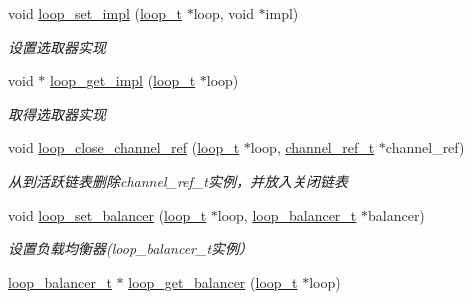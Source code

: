 \begin{DoxyCompactItemize}
void \hyperlink{a00052_aa9654f1b872059f74665506fd67c9bc5_aa9654f1b872059f74665506fd67c9bc5}{loop\+\_\+set\+\_\+impl} (\hyperlink{a00044_a9c3ad1cd2de83e09f3a7b59fa82c94ee_a9c3ad1cd2de83e09f3a7b59fa82c94ee}{loop\+\_\+t} $\ast$loop, void $\ast$impl)
\begin{DoxyCompactList}\small\item\em 设置选取器实现 \end{DoxyCompactList}\item 
void $\ast$ \hyperlink{a00052_a0f78295541723911955dd41b71ceece1_a0f78295541723911955dd41b71ceece1}{loop\+\_\+get\+\_\+impl} (\hyperlink{a00044_a9c3ad1cd2de83e09f3a7b59fa82c94ee_a9c3ad1cd2de83e09f3a7b59fa82c94ee}{loop\+\_\+t} $\ast$loop)
\begin{DoxyCompactList}\small\item\em 取得选取器实现 \end{DoxyCompactList}\item 
void \hyperlink{a00052_a9328cf8ba2faccbf363b41e524631b75_a9328cf8ba2faccbf363b41e524631b75}{loop\+\_\+close\+\_\+channel\+\_\+ref} (\hyperlink{a00044_a9c3ad1cd2de83e09f3a7b59fa82c94ee_a9c3ad1cd2de83e09f3a7b59fa82c94ee}{loop\+\_\+t} $\ast$loop, \hyperlink{a00044_a151271c9d188ef28d4d24bb81dcc1263_a151271c9d188ef28d4d24bb81dcc1263}{channel\+\_\+ref\+\_\+t} $\ast$channel\+\_\+ref)
\begin{DoxyCompactList}\small\item\em 从到活跃链表删除channel\+\_\+ref\+\_\+t实例，并放入关闭链表 \end{DoxyCompactList}\item 
void \hyperlink{a00052_abedbb538c1cc8ef805dbfc0f58d80f9e_abedbb538c1cc8ef805dbfc0f58d80f9e}{loop\+\_\+set\+\_\+balancer} (\hyperlink{a00044_a9c3ad1cd2de83e09f3a7b59fa82c94ee_a9c3ad1cd2de83e09f3a7b59fa82c94ee}{loop\+\_\+t} $\ast$loop, \hyperlink{a00044_a649c7e850ab247b5f70ad27e335a129d_a649c7e850ab247b5f70ad27e335a129d}{loop\+\_\+balancer\+\_\+t} $\ast$balancer)
\begin{DoxyCompactList}\small\item\em 设置负载均衡器(loop\+\_\+balancer\+\_\+t实例） \end{DoxyCompactList}\item 
\hyperlink{a00044_a649c7e850ab247b5f70ad27e335a129d_a649c7e850ab247b5f70ad27e335a129d}{loop\+\_\+balancer\+\_\+t} $\ast$ \hyperlink{a00052_a1f9df6866c80e91a620320298d199315_a1f9df6866c80e91a620320298d199315}{loop\+\_\+get\+\_\+balancer} (\hyperlink{a00044_a9c3ad1cd2de83e09f3a7b59fa82c94ee_a9c3ad1cd2de83e09f3a7b59fa82c94ee}{loop\+\_\+t} $\ast$loop)

\end{DoxyCompactItemize}
